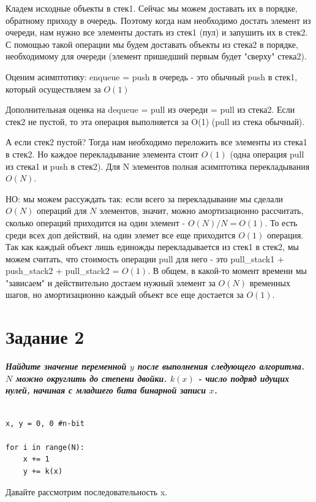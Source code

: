 \documentclass{article}
\begin{document}
Кладем исходные объекты в стек1. Сейчас мы можем доставать их в порядке, обратному приходу в очередь. Поэтому когда нам необходимо достать элемент из очереди, нам нужно все элементы достать из стек1 (пул) и запушить их в стек2. С помощью такой операции мы будем доставать объекты из стека2 в порядке, необходимому для очереди (элемент пришедший первым будет "сверху" стека2).

Оценим асимптотику: enqueue = push в очередь - это обычный push в стек1, который осуществляем за $O(1)$

Дополнительная оценка на dequeue = pull из очереди = pull из стека2. Если стек2 не пустой, то эта операция выполняется за O(1) (pull из стека обычный). 

А если стек2 пустой? Тогда нам необходимо переложить все элементы из стека1 в стек2. Но каждое перекладывание элемента стоит $O(1)$ (одна операция pull из стека1 и push в стек2). Для N элементов полная асимптотика перекладывания $O(N)$.

НО: мы можем рассуждать так: если всего за перекладывание мы сделали $O(N)$ операций для $N$ элементов, значит, можно амортизационно рассчитать, сколько операций приходится на один элемент - $O(N) / N = O(1)$. То есть среди всех доп действий, на один элемет все еще приходится $O(1)$ операция. Так как каждый объект лишь единожды перекладывается из стек1 в стек2, мы можем считать, что стоимость операции pull для него - это pull\_stack1 + push\_stack2 + pull\_stack2 = $O(1)$. В общем, в какой-то момент времени мы "зависаем" и действительно достаем нужный элемент за $O(N)$ временных шагов, но амортизационно каждый объект все еще достается за $O(1)$.


\bigskip

\section*{\textbf{Задание 2}} \textbf{\textit{Найдите значение переменной $y$ после выполнения следующего алгоритма. $N$ можно округлить до степени двойки. $k(x)$ - число подряд идущих нулей, начиная с младшего бита бинарной записи $x$.}}

\begin{lstlisting}

x, y = 0, 0 #n-bit

for i in range(N):
    x += 1
    y += k(x)

\end{lstlisting}

Давайте рассмотрим последовательность x. 
\end{document}
